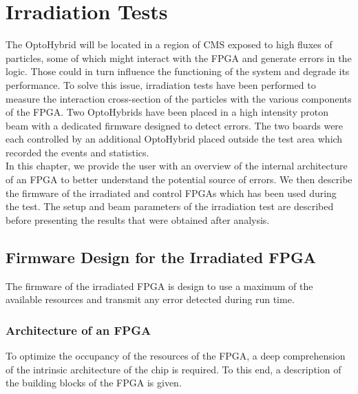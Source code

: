 \chapter{Irradiation Tests}
\label{chap:II-6-irradiation}

  The OptoHybrid will be located in a region of CMS exposed to high fluxes of particles, some of which might interact with the FPGA and generate errors in the logic. Those could in turn influence the functioning of the system and degrade its performance. To solve this issue, irradiation tests have been performed to measure the interaction cross-section of the particles with the various components of the FPGA. Two OptoHybrids have been placed in a high intensity proton beam with a dedicated firmware designed to detect errors. The two boards were each controlled by an additional OptoHybrid placed outside the test area which recorded the events and statistics. \\

  In this chapter, we provide the user with an overview of the internal architecture of an FPGA to better understand the potential source of errors. We then describe the firmware of the irradiated and control FPGAs which has been used during the test. The setup and beam parameters of the irradiation test are described before presenting the results that were obtained after analysis.

  \section{Firmware Design for the Irradiated FPGA}

    The firmware of the irradiated FPGA is design to use a maximum of the available resources and transmit any error detected during run time.

    \subsection{Architecture of an FPGA}

      To optimize the occupancy of the resources of the FPGA, a deep comprehension of the intrinsic architecture of the chip is required. To this end, a description of the building blocks of the FPGA is given.

